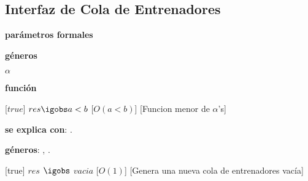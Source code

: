\begin{Interfaz}
\subsection{Interfaz de Cola de Entrenadores}

  \textbf{par\'ametros formales}\parindent\\
  \parbox{1.7cm}{\textbf{g\'eneros}} $\alpha$\\
  \parbox[t]{1.7cm}{\textbf{funci\'on}}\parbox[t]{\textwidth-2\parindent-1.7cm}{%
    [$true$]
    {$res \igobs a < b$}
    [$O(a < b)$]
    [Funcion menor de $\alpha$'s]
  }

\textbf{se explica con}: .

\textbf{g\'eneros}: , .



%
[true]   %
{$res$ $\igobs$ $vacia$} %
[$O(1)$]   %
[Genera una nueva cola de entrenadores vac\'ia]  %

\end{Interfaz}